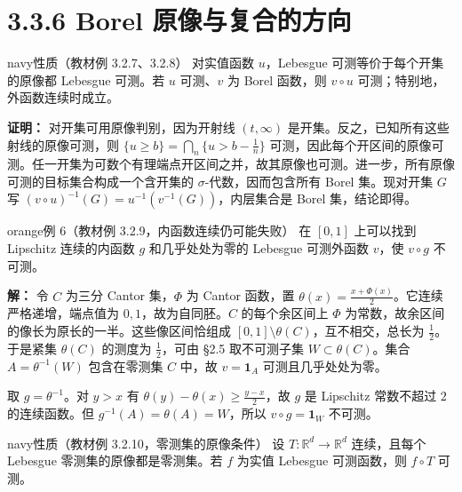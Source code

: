 \documentclass[11pt,a4paper]{article}
\begin{document}
\clearpage\section[\S{}3.3.6 Borel
原像与复合的方向]{3.3.6 Borel
原像与复合的方向}\label{borel-ux539fux50cfux4e0eux590dux5408ux7684ux65b9ux5411}

\begin{sboxenv}{navy}{性质（教材例 3.2.7、3.2.8）}
对实值函数 \(u\)，Lebesgue 可测等价于每个开集的原像都 Lebesgue 可测。若
\(u\) 可测、\(v\) 为 Borel 函数，则 \(v\circ u\)
可测；特别地，外函数连续时成立。

\end{sboxenv}

\textbf{证明：} 对开集可用原像判别，因为开射线 \((t,\infty)\)
是开集。反之，已知所有这些射线的原像可测，则
\(\{u\ge b\}=\bigcap_n\{u>b-\frac{1}{n}\}\)
可测，因此每个开区间的原像可测。任一开集为可数个有理端点开区间之并，故其原像也可测。进一步，所有原像可测的目标集合构成一个含开集的
\(\sigma\)-代数，因而包含所有 Borel 集。现对开集 \(G\) 写
\((v\circ u)^{-1}(G)=u^{-1}(v^{-1}(G))\)，内层集合是 Borel
集，结论即得。

\begin{sboxenv}{orange}{例 6（教材例 3.2.9，内函数连续仍可能失败）}
在 \([0,1]\) 上可以找到 Lipschitz 连续的内函数 \(g\) 和几乎处处为零的
Lebesgue 可测外函数 \(v\)，使 \(v\circ g\) 不可测。

\end{sboxenv}

\textbf{解：} 令 \(C\) 为三分 Cantor 集，\(\Phi\) 为 Cantor 函数，置
\(\theta(x)=\frac{x+\Phi(x)}{2}\)。它连续严格递增，端点值为
\(0,1\)，故为自同胚。\(C\) 的每个余区间上 \(\Phi\)
为常数，故余区间的像长为原长的一半。这些像区间恰组成
\([0,1]\setminus\theta(C)\)，互不相交，总长为 \(\frac{1}{2}\)。于是紧集
\(\theta(C)\) 的测度为 \(\frac{1}{2}\)，可由 §2.5 取不可测子集
\(W\subset\theta(C)\)。集合 \(A=\theta^{-1}(W)\) 包含在零测集 \(C\)
中，故 \(v=\mathbf1_A\) 可测且几乎处处为零。

取 \(g=\theta^{-1}\)。对 \(y>x\) 有
\(\theta(y)-\theta(x)\ge\frac{y-x}{2}\)，故 \(g\) 是 Lipschitz
常数不超过 \(2\) 的连续函数。但 \(g^{-1}(A)=\theta(A)=W\)，所以
\(v\circ g=\mathbf1_W\) 不可测。

\begin{sboxenv}{navy}{性质（教材例 3.2.10，零测集的原像条件）}
设 \(T:\mathbb R^d\to\mathbb R^d\) 连续，且每个 Lebesgue
零测集的原像都是零测集。若 \(f\) 为实值 Lebesgue 可测函数，则
\(f\circ T\) 可测。

\end{sboxenv}
\end{document}
